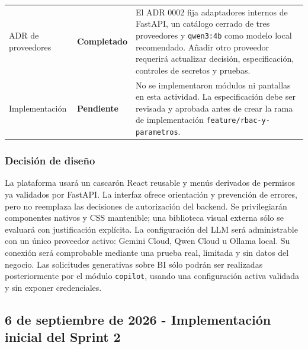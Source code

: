 \documentclass[11pt,letterpaper]{article}
\newcommand{\statusok}{\textcolor{deepgreen}{\textbf{Completado}}}
\newcommand{\statuspending}{\textcolor{warning}{\textbf{Pendiente}}}
\newcommand{\file}[1]{\texttt{#1}}
\begin{document}
\begin{longtable}{@{}p{}p{}p{}@{}}
  ADR de proveedores & \statusok & El ADR 0002 fija adaptadores internos de FastAPI, un catálogo cerrado de tres proveedores y \file{qwen3:4b} como modelo local recomendado. Añadir otro proveedor requerirá actualizar decisión, especificación, controles de secretos y pruebas. \\
  Implementación & \statuspending & No se implementaron módulos ni pantallas en esta actividad. La especificación debe ser revisada y aprobada antes de crear la rama de implementación \file{feature/rbac-y-parametros}. \\
  \bottomrule
\end{longtable}

\subsubsection{Decisión de diseño}

La plataforma usará un cascarón React reusable y menús derivados de permisos ya validados por FastAPI. La interfaz ofrece orientación y prevención de errores, pero no reemplaza las decisiones de autorización del backend. Se privilegiarán componentes nativos y CSS mantenible; una biblioteca visual externa sólo se evaluará con justificación explícita. La configuración del LLM será administrable con un único proveedor activo: Gemini Cloud, Qwen Cloud u Ollama local. Su conexión será comprobable mediante una prueba real, limitada y sin datos del negocio. Las solicitudes generativas sobre BI sólo podrán ser realizadas posteriormente por el módulo \file{copilot}, usando una configuración activa validada y sin exponer credenciales.

\clearpage
\subsection{6 de septiembre de 2026 - Implementación inicial del Sprint 2}
\end{document}
